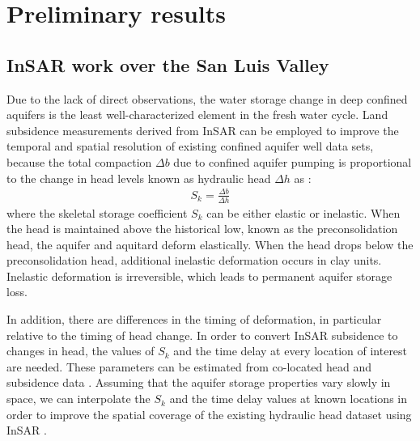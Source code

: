 \documentclass[11pt,final]{article}%
\renewcommand{\citep}{\cite}
\begin{document}


\section{Preliminary results}\label{sec:previous}
\subsection{InSAR work over the San Luis Valley}
Due to the lack of direct observations, the water storage change in deep confined aquifers is the least well-characterized element in the fresh water cycle. Land subsidence measurements derived from InSAR can be employed to improve the temporal and spatial resolution of existing confined aquifer well data sets, because the total compaction $\Delta b$ due to confined aquifer pumping is proportional to the change in head levels known as hydraulic head $\Delta h$ as \citep[e.g.,][]{galloway2011}:
\begin{align}
  S_{k} = \frac{\Delta b}{\Delta h}
\label{eq:elastic}  
\end{align}
where the skeletal storage coefficient $S_{k}$ can be either elastic or inelastic. When the head is maintained above the historical low, known as the preconsolidation head, the aquifer and aquitard deform elastically. When the head drops below the preconsolidation head, additional inelastic deformation occurs in clay units. Inelastic deformation is irreversible, which leads to permanent aquifer storage loss. 

In addition, there are differences in the timing of deformation, in particular relative to the timing of head change. In order to convert InSAR subsidence to changes in head, the values of $S_{k}$  and the time delay at every location of interest are needed. These parameters can be estimated from co-located head and subsidence data \citep{Chen2016}. Assuming that the aquifer storage properties vary slowly in space, we can interpolate the $S_{k}$ and the time delay values at known locations in order to improve the spatial coverage of the existing hydraulic head dataset using InSAR \citep{Chen2017}.
\end{document}
